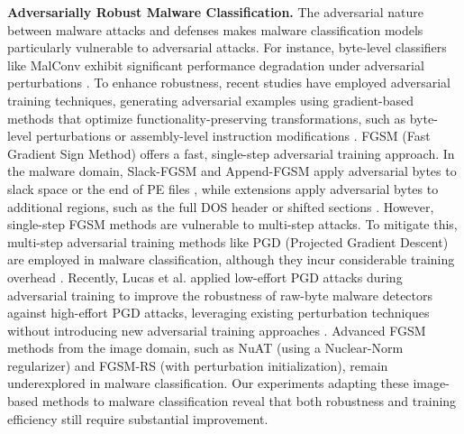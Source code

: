 \vspace{0.1cm}
\noindent\textbf{Adversarially Robust Malware Classification. } 
The adversarial nature between malware attacks and defenses makes malware classification models particularly vulnerable to adversarial attacks. For instance, byte-level classifiers like MalConv exhibit significant performance degradation under adversarial perturbations \cite{ref28}. To enhance robustness, recent studies have employed adversarial training techniques, generating adversarial examples using gradient-based methods that optimize functionality-preserving transformations, such as byte-level perturbations \cite{ref27} or assembly-level instruction modifications \cite{ref62}. FGSM (Fast Gradient Sign Method) offers a fast, single-step adversarial training approach. In the malware domain, Slack-FGSM and Append-FGSM apply adversarial bytes to slack space or the end of PE files \cite{ref31,ref29}, while extensions apply adversarial bytes to additional regions, such as the full DOS header or shifted sections \cite{ref27,ref28}. However, single-step FGSM methods are vulnerable to multi-step attacks. To mitigate this, multi-step adversarial training methods like PGD (Projected Gradient Descent) \cite{ref55} are employed in malware classification, although they incur considerable training overhead \cite{ref56}. Recently, Lucas et al. applied low-effort PGD attacks during adversarial training to improve the robustness of raw-byte malware detectors against high-effort PGD attacks, leveraging existing perturbation techniques without introducing new adversarial training approaches \cite{ref56}. Advanced FGSM methods from the image domain, such as NuAT (using a Nuclear-Norm regularizer) and FGSM-RS (with perturbation initialization), remain underexplored in malware classification. Our experiments adapting these image-based methods to malware classification reveal that both robustness and training efficiency still require substantial improvement.







